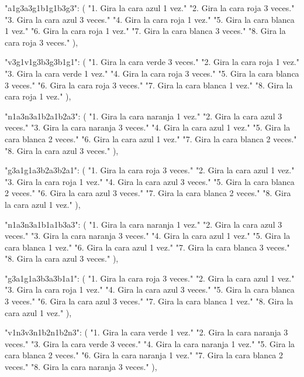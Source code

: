 {{    "a1g3a3g1b1g1b3g3": (
        "1. Gira la cara azul 1 vez.\n"
        "2. Gira la cara roja 3 veces.\n"
        "3. Gira la cara azul 3 veces.\n"
        "4. Gira la cara roja 1 vez.\n"
        "5. Gira la cara blanca 1 vez.\n"
        "6. Gira la cara roja 1 vez.\n"
        "7. Gira la cara blanca 3 veces.\n"
        "8. Gira la cara roja 3 veces."
    ),
    
    "v3g1v1g3b3g3b1g1": (
        "1. Gira la cara verde 3 veces.\n"
        "2. Gira la cara roja 1 vez.\n"
        "3. Gira la cara verde 1 vez.\n"
        "4. Gira la cara roja 3 veces.\n"
        "5. Gira la cara blanca 3 veces.\n"
        "6. Gira la cara roja 3 veces.\n"
        "7. Gira la cara blanca 1 vez.\n"
        "8. Gira la cara roja 1 vez."
    ),
    
    "n1a3n3a1b2a1b2a3": (
        "1. Gira la cara naranja 1 vez.\n"
        "2. Gira la cara azul 3 veces.\n"
        "3. Gira la cara naranja 3 veces.\n"
        "4. Gira la cara azul 1 vez.\n"
        "5. Gira la cara blanca 2 veces.\n"
        "6. Gira la cara azul 1 vez.\n"
        "7. Gira la cara blanca 2 veces.\n"
        "8. Gira la cara azul 3 veces."
    ),
    
    "g3a1g1a3b2a3b2a1": (
        "1. Gira la cara roja 3 veces.\n"
        "2. Gira la cara azul 1 vez.\n"
        "3. Gira la cara roja 1 vez.\n"
        "4. Gira la cara azul 3 veces.\n"
        "5. Gira la cara blanca 2 veces.\n"
        "6. Gira la cara azul 3 veces.\n"
        "7. Gira la cara blanca 2 veces.\n"
        "8. Gira la cara azul 1 vez."
    ),
    
    "n1a3n3a1b1a1b3a3": (
        "1. Gira la cara naranja 1 vez.\n"
        "2. Gira la cara azul 3 veces.\n"
        "3. Gira la cara naranja 3 veces.\n"
        "4. Gira la cara azul 1 vez.\n"
        "5. Gira la cara blanca 1 vez.\n"
        "6. Gira la cara azul 1 vez.\n"
        "7. Gira la cara blanca 3 veces.\n"
        "8. Gira la cara azul 3 veces."
    ),
    
    "g3a1g1a3b3a3b1a1": (
        "1. Gira la cara roja 3 veces.\n"
        "2. Gira la cara azul 1 vez.\n"
        "3. Gira la cara roja 1 vez.\n"
        "4. Gira la cara azul 3 veces.\n"
        "5. Gira la cara blanca 3 veces.\n"
        "6. Gira la cara azul 3 veces.\n"
        "7. Gira la cara blanca 1 vez.\n"
        "8. Gira la cara azul 1 vez."
    ),
    
    "v1n3v3n1b2n1b2n3": (
        "1. Gira la cara verde 1 vez.\n"
        "2. Gira la cara naranja 3 veces.\n"
        "3. Gira la cara verde 3 veces.\n"
        "4. Gira la cara naranja 1 vez.\n"
        "5. Gira la cara blanca 2 veces.\n"
        "6. Gira la cara naranja 1 vez.\n"
        "7. Gira la cara blanca 2 veces.\n"
        "8. Gira la cara naranja 3 veces."
    ),
    
}}
